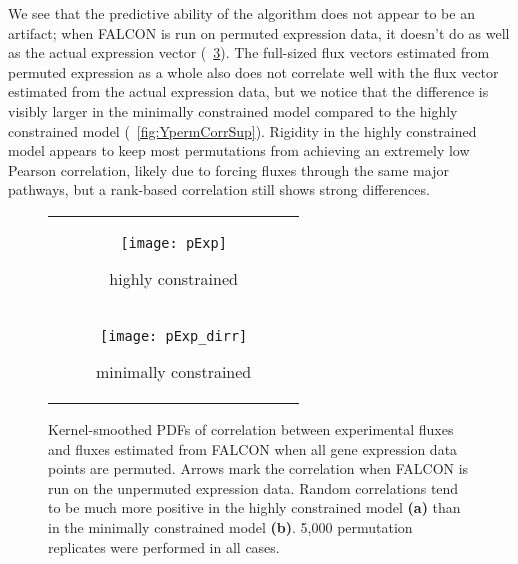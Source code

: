 We see that the predictive ability of the algorithm does not
appear to be an artifact; when FALCON is run on permuted expression data,
it doesn't do as well as the actual expression vector (\Fig~\ref{fig:YpermCorr}).
The full-sized flux vectors estimated from permuted expression as a
whole also does not correlate well with the flux vector estimated from
the actual expression data, but we notice that the difference is
visibly larger in the minimally constrained model compared to the
highly constrained model (\suppOrApp \Fig~\ref{fig:YpermCorrSup}). Rigidity in the
highly constrained model appears to keep most permutations from
achieving an extremely low Pearson correlation, likely due to forcing
fluxes through the same major pathways, but a rank-based correlation
still shows strong differences.
 
\begin{figure}
\centering
\begin{tabular}{c}
  \begin{subfigure}[b]{0.5\textwidth}
  \texttt{[image: pExp]}
  \caption{highly constrained} \label{fig:YpermCorr:A}
  \end{subfigure}
\\
  \begin{subfigure}[b]{0.5\textwidth}
  \texttt{[image: pExp\_dirr]}
  \caption{minimally constrained} \label{fig:YpermCorr:B}
  \end{subfigure} 
\\
\end{tabular}
\vspace{-4mm} 
\caption{Kernel-smoothed PDFs of correlation between experimental
fluxes and fluxes estimated from FALCON when all gene expression data
points are permuted. Arrows mark the correlation when FALCON is run on
the unpermuted expression data.  Random correlations tend to be much
more positive in the highly constrained model \textbf{(a)} than in the
minimally constrained model \textbf{(b)}. 5,000 permutation replicates
were performed in all cases.}
\label{fig:YpermCorr}
\end{figure}


